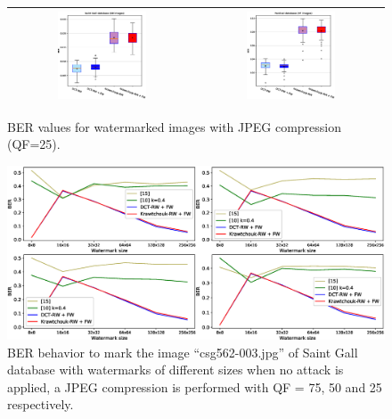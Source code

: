 \documentclass[runningheads]{llncs}
\begin{document}
\begin{figure}[H]
	\begin{center}
		\begin{tabular}{|c|c|}\hline
			\includegraphics[width=0.5\textwidth]{BER25SaintGall.eps}
			&\includegraphics[width=0.5\textwidth]{BER25Parzival.eps}\\\hline
		\end{tabular}
	\end{center}
	\caption{BER values for watermarked images with JPEG compression (QF=25).}
	\label{ber25}
\end{figure} 

\begin{figure}
	\begin{center}
		\includegraphics[width=1.1\textwidth]{BERwsizeSaintGall.eps}
		\caption{BER behavior to mark the image ``csg562-003.jpg'' of Saint Gall database with watermarks of different sizes when no attack is applied, a JPEG compression is performed with QF = 75, 50 and 25 respectively.} \label{berwsizeSaintGall}
	\end{center}
\end{figure}
\end{document}
